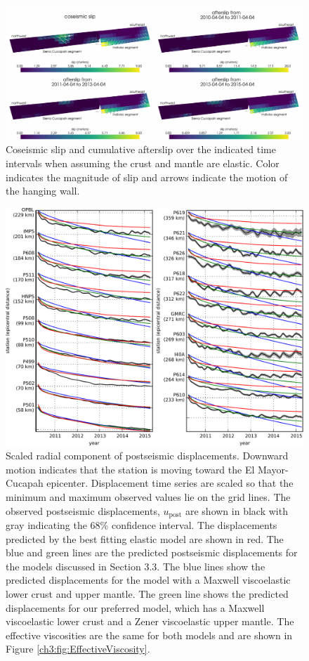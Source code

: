 \begin{figure}
\includegraphics[scale=1.0]{ch3/figures/2016jb013114-p06}
\caption{Coseismic slip and cumulative afterslip over the indicated time intervals when assuming the crust and mantle are elastic.  Color indicates the magnitude of slip and arrows indicate the motion of the hanging wall.}
\label{ch3:fig:ElasticSlip}
\end{figure}

\begin{figure}
\includegraphics[scale=1.0]{ch3/figures/2016jb013114-p07}
\caption{Scaled radial component of postseismic displacements. Downward motion indicates that the station is moving toward the El Mayor-Cucapah epicenter.  Displacement time series are scaled so that the minimum and maximum observed values lie on the grid lines.  The observed postseismic displacements, $u_\mathrm{post}$ are shown in black with gray indicating the 68\% confidence interval.  The displacements predicted by the best fitting elastic model are shown in red.  The blue and green lines are the predicted postseismic displacements for the models discussed in Section 3.3. The blue lines show the predicted displacements for the model with a Maxwell viscoelastic lower crust and upper mantle.  The green line shows the predicted displacements for our preferred model, which has a Maxwell viscoelastic lower crust and a Zener viscoelastic upper mantle.  The effective viscosities are the same for both models and are shown in Figure \ref{ch3:fig:EffectiveViscosity}.}
\label{ch3:fig:RecordSectionMain}
\end{figure}

